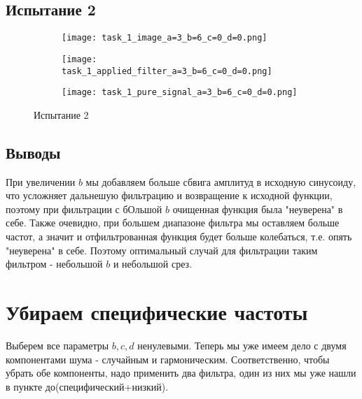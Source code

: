 \newpage
\subsection{Испытание 2}

\begin{figure}[!ht]
	\centering
\hspace*{\fill}%
	\begin{subfigure}[b]{0.30\textwidth}
        \centering
		\texttt{[image: task\_1\_image\_a=3\_b=6\_c=0\_d=0.png]}
		\caption{}
	
	\end{subfigure}
\hfill
	\begin{subfigure}[b]{0.30\textwidth}
        \centering
		\texttt{[image: task\_1\_applied\_filter\_a=3\_b=6\_c=0\_d=0.png]}
        \caption{}
		
	\end{subfigure}
\hspace*{\fill}%
\par\vspace{\abovecaptionskip}
        \begin{subfigure}[b]{0.30\textwidth}
        \centering
		\texttt{[image: task\_1\_pure\_signal\_a=3\_b=6\_c=0\_d=0.png]}
		\caption{}
	
	\end{subfigure}
	\caption{Испытание 2}
\end{figure}


\newpage
\subsection{Выводы}

При увеличении $b$ мы добавляем больше сбвига амплитуд в исходную синусоиду, что усложняет дальнешую фильтрацию и возвращение
 к исходной функции, поэтому при фильтрации с бОльшой $b$ очищенная функция была "неуверена" в себе.
Также очевидно, при большем диапазоне фильтра мы оставляем больше частот, а значит и отфильтрованная функция будет больше колебаться, т.е. опять "неуверена" в себе. Поэтому оптимальный случай для фильтрации таким фильтром - небольшой $b$ и небольшой срез.

\section{Убираем специфические частоты}

Выберем все параметры $b, c, d$ ненулевыми. Теперь мы уже имеем дело с двумя компонентами шума - случайным и гармоническим. Соответственно, чтобы убрать обе компоненты, надо применить два фильтра, один из них мы уже нашли в пункте до(специфический+низкий).

